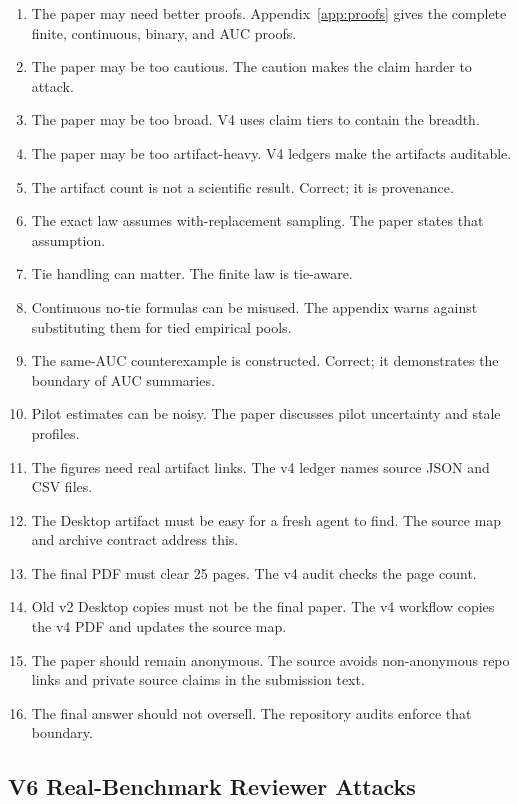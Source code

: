 \begin{enumerate}
audit; new regret theorems would change scope.
\item The paper may need better proofs. Appendix~\ref{app:proofs} gives the
complete finite, continuous, binary, and AUC proofs.
\item The paper may be too cautious. The caution makes the claim harder to
attack.
\item The paper may be too broad. V4 uses claim tiers to contain the breadth.
\item The paper may be too artifact-heavy. V4 ledgers make the artifacts
auditable.
\item The artifact count is not a scientific result. Correct; it is
provenance.
\item The exact law assumes with-replacement sampling. The paper states that
assumption.
\item Tie handling can matter. The finite law is tie-aware.
\item Continuous no-tie formulas can be misused. The appendix warns against
substituting them for tied empirical pools.
\item The same-AUC counterexample is constructed. Correct; it demonstrates the
boundary of AUC summaries.
\item Pilot estimates can be noisy. The paper discusses pilot uncertainty and
stale profiles.
\item The figures need real artifact links. The v4 ledger names source JSON
and CSV files.
\item The Desktop artifact must be easy for a fresh agent to find. The source
map and archive contract address this.
\item The final PDF must clear 25 pages. The v4 audit checks the page count.
\item Old v2 Desktop copies must not be the final paper. The v4 workflow
copies the v4 PDF and updates the source map.
\item The paper should remain anonymous. The source avoids non-anonymous repo
links and private source claims in the submission text.
\item The final answer should not oversell. The repository audits enforce that
boundary.
\end{enumerate}

\subsection{V6 Real-Benchmark Reviewer Attacks}
\label{app:v6-reviewer-attacks}

